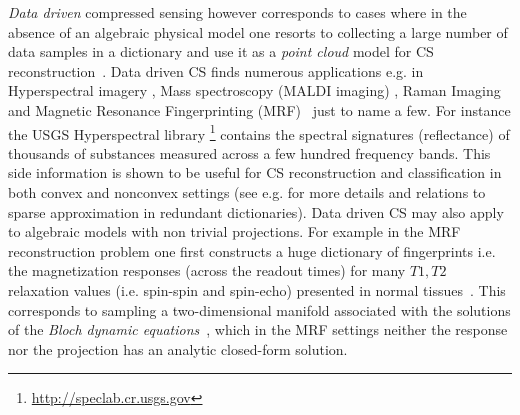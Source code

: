 \emph{Data driven} compressed sensing however corresponds to cases where in the absence of an algebraic physical model one resorts to collecting a large number of data samples in a dictionary and use it as a \emph{point cloud} model for CS reconstruction~\cite{RichCSreview}.  
Data driven CS finds numerous applications e.g. in Hyperspectral imagery \cite{TIPHSI}, Mass spectroscopy (MALDI imaging) \cite{Kobarg2014}, Raman Imaging~\cite{ramanCS} and Magnetic Resonance Fingerprinting (MRF)~\cite{MRF,BLIPsiam} just to name a few. For instance the USGS Hyperspectral library \footnote{\url{http://speclab.cr.usgs.gov}} contains the spectral signatures (reflectance) of thousands of substances measured across a few hundred frequency bands. This side information is shown to be useful for CS reconstruction and classification in both convex and nonconvex settings (see e.g. \cite{TIPHSI} for more details and relations to sparse approximation in redundant dictionaries).  
Data driven CS may also apply to algebraic models with non trivial projections. For example in the MRF reconstruction problem one first constructs a huge  dictionary of fingerprints i.e. the magnetization responses (across the readout times) for many $T1,T2$ relaxation values (i.e. spin-spin and spin-echo) presented in normal tissues~\cite{MRF}. This corresponds to sampling a two-dimensional manifold associated with the solutions of the \emph{Bloch dynamic  equations}~\cite{BLIPsiam}, which in the MRF settings neither the response nor the projection has an analytic closed-form solution.


